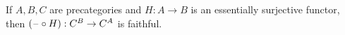 \documentclass[hott-all.tex]{subfiles}
\begin{document}
\begin{lem}\label{ct:esosurj-postcomp-faithful}
  If $A,B,C$ are precategories and $H:A\to B$ is an essentially surjective functor, then $(\mathord{\hspace{1pt}\text{--}\hspace{1pt}}\circ H):C^B \to C^A$ is faithful.
\end{lem}
\end{document}

